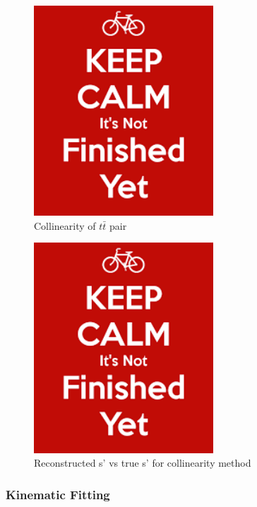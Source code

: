 \begin{figure}
  \centering
  \includegraphics[width=0.6\textwidth]{TopAnalysis/figures/dummy}
  \caption[Collinearity of $t\bar{t}$ pair]{Collinearity of $t\bar{t}$ pair}
  \label{fig:Collinearity}
\end{figure}

\begin{figure}
  \centering
  \includegraphics[width=0.6\textwidth]{TopAnalysis/figures/dummy}
  \caption[Reconstructed s' vs true s' for collinearity method]{Reconstructed s' vs true s' for collinearity method}
  \label{fig:CollinearitySPrime}
\end{figure}

\subsubsection{Kinematic Fitting}







